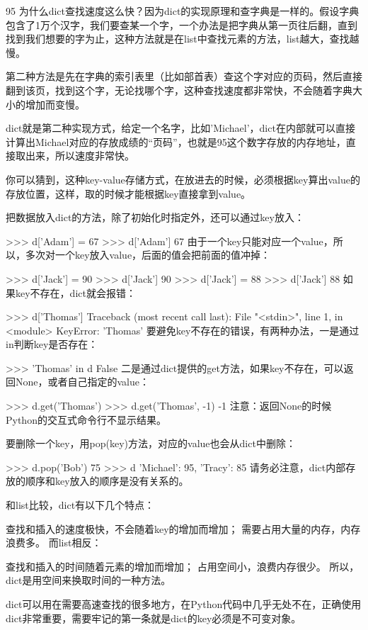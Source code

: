 95
为什么dict查找速度这么快？因为dict的实现原理和查字典是一样的。假设字典包含了1万个汉字，我们要查某一个字，一个办法是把字典从第一页往后翻，直到找到我们想要的字为止，这种方法就是在list中查找元素的方法，list越大，查找越慢。

第二种方法是先在字典的索引表里（比如部首表）查这个字对应的页码，然后直接翻到该页，找到这个字，无论找哪个字，这种查找速度都非常快，不会随着字典大小的增加而变慢。

dict就是第二种实现方式，给定一个名字，比如'Michael'，dict在内部就可以直接计算出Michael对应的存放成绩的“页码”，也就是95这个数字存放的内存地址，直接取出来，所以速度非常快。

你可以猜到，这种key-value存储方式，在放进去的时候，必须根据key算出value的存放位置，这样，取的时候才能根据key直接拿到value。

把数据放入dict的方法，除了初始化时指定外，还可以通过key放入：

>>> d['Adam'] = 67
>>> d['Adam']
67
由于一个key只能对应一个value，所以，多次对一个key放入value，后面的值会把前面的值冲掉：

>>> d['Jack'] = 90
>>> d['Jack']
90
>>> d['Jack'] = 88
>>> d['Jack']
88
如果key不存在，dict就会报错：

>>> d['Thomas']
Traceback (most recent call last):
  File "<stdin>", line 1, in <module>
KeyError: 'Thomas'
要避免key不存在的错误，有两种办法，一是通过in判断key是否存在：

>>> 'Thomas' in d
False
二是通过dict提供的get方法，如果key不存在，可以返回None，或者自己指定的value：

>>> d.get('Thomas')
>>> d.get('Thomas', -1)
-1
注意：返回None的时候Python的交互式命令行不显示结果。

要删除一个key，用pop(key)方法，对应的value也会从dict中删除：

>>> d.pop('Bob')
75
>>> d
{'Michael': 95, 'Tracy': 85}
请务必注意，dict内部存放的顺序和key放入的顺序是没有关系的。

和list比较，dict有以下几个特点：

查找和插入的速度极快，不会随着key的增加而增加；
需要占用大量的内存，内存浪费多。
而list相反：

查找和插入的时间随着元素的增加而增加；
占用空间小，浪费内存很少。
所以，dict是用空间来换取时间的一种方法。

dict可以用在需要高速查找的很多地方，在Python代码中几乎无处不在，正确使用dict非常重要，需要牢记的第一条就是dict的key必须是不可变对象。

